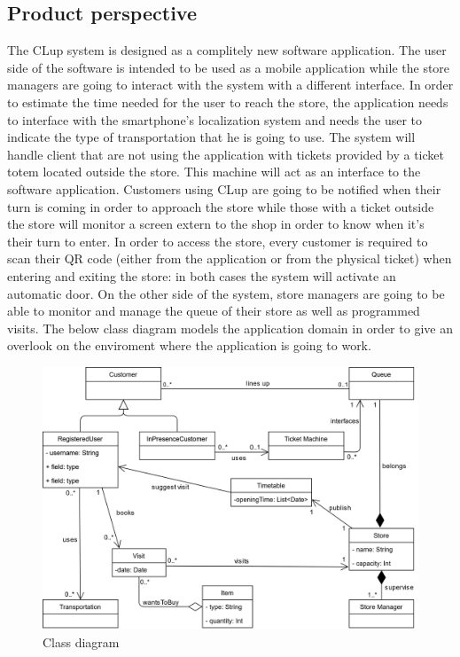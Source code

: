 \documentclass[]{article}
\begin{document}
		\subsection{Product perspective}
		The CLup system is designed as a complitely new software application. The user side of the software is intended to be used as a mobile application while the store managers are going to interact with the system with a different interface. \newline
		In order to estimate the time needed for the user to reach the store, the application needs to interface with the smartphone's localization system and needs the user to indicate the type of transportation that he is going to use. \newline
		The system will handle client that are not using the application with tickets provided by a ticket totem located outside the store. This machine will act as an interface to the software application. \newline
		Customers using CLup are going to be notified when their turn is coming in order to approach the store while those with a ticket outside the store will monitor a screen extern to the shop in order to know when it's their turn to enter. \newline
		In order to access the store, every customer is required to scan their QR code (either from the application or from the physical ticket) when entering and exiting the store: in both cases the system will activate an automatic door. \newline
		On the other side of the system, store managers are going to be able to monitor and manage the queue of their store as well as programmed visits. \newline
		The below class diagram models the application domain in order to give an overlook on the enviroment where the application is going to work. \newline
		
		\begin{figure}[htp]
			\centering
			\includegraphics[scale=0.95]{UML_class_diagram.png}
			\caption{Class diagram}
			\label{fig:class_diagram}
		\end{figure}
		
\end{document}
